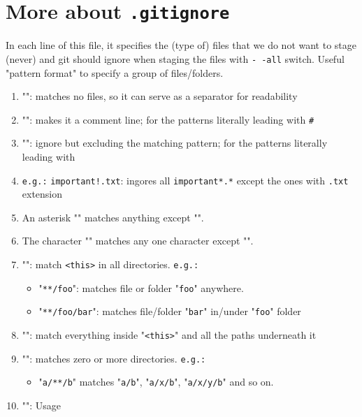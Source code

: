 \section{More about \texttt{.gitignore}}   \label{app:ignore-cmd}
In each line of this file, it specifies the (type of) files that we do not want to stage (never) and git should ignore when staging the files with \texttt{-\,-all} switch.
\nl Useful "pattern format" to specify a group of files/folders.

\begin{enumerate}\packed
	\item "": matches no files, so it can serve as a separator for readability
	\item "\TT{\#}": makes it a comment line; \TT{\textbackslash{}\#} for the patterns literally leading with \texttt{\#}
	\item "\TT{!}": ignore but excluding the matching pattern; \TT{\textbackslash{}\!} for the patterns literally leading with \texttt{\!}
	\item[] \texttt{e.g.:} \texttt{\!important!.txt}: ingores all \texttt{\!important*.*} except the ones with \texttt{.txt} extension
	\item An asterisk "\TT{*}" matches anything except "\TT{\textbackslash{}}".
	\item The character "" matches any one character except "\TT{\textbackslash{}}".
	\item "": match \texttt{<this>} in all directories. \texttt{e.g.:}
	      \begin{itemize}\packed
		      \item "\texttt{**/foo}": matches file or folder "\texttt{foo}" anywhere.
		      \item "\texttt{**/foo/bar}": matches file/folder "\texttt{bar}" in/under "\texttt{foo}" folder
	      \end{itemize}
	\item "": match everything inside "\texttt{<this>}" and all the paths underneath it
	\item "\TT{/**/}": matches zero or more directories. \texttt{e.g.:}
	      \begin{itemize}\packed
		      \item "\texttt{a/**/b}" matches "\texttt{a/b}", "\texttt{a/x/b}", "\texttt{a/x/y/b}" and so on.
	      \end{itemize}
	\item "\TT{*}": Usage
	      \begin{itemize}\packed

\end{itemize}
\end{enumerate}
